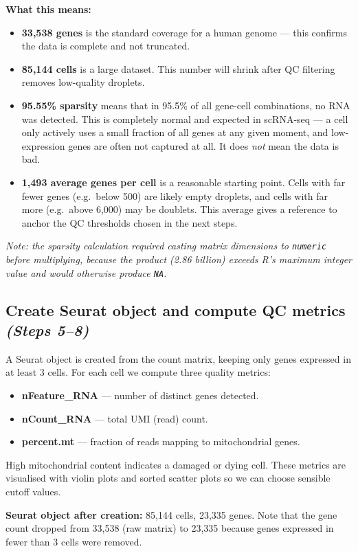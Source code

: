 \documentclass[11pt, a4paper]{article}
\begin{document}
\textbf{What this means:}
\begin{itemize}[nosep]
  \item \textbf{33,538 genes} is the standard coverage for a human genome — this confirms the data is complete and not truncated.
  \item \textbf{85,144 cells} is a large dataset. This number will shrink after QC filtering removes low-quality droplets.
  \item \textbf{95.55\% sparsity} means that in 95.5\% of all gene-cell combinations, no RNA was detected. This is completely normal and expected in scRNA-seq — a cell only actively uses a small fraction of all genes at any given moment, and low-expression genes are often not captured at all. It does \textit{not} mean the data is bad.
  \item \textbf{1,493 average genes per cell} is a reasonable starting point. Cells with far fewer genes (e.g.\ below 500) are likely empty droplets, and cells with far more (e.g.\ above 6,000) may be doublets. This average gives a reference to anchor the QC thresholds chosen in the next steps.
\end{itemize}

\textit{Note: the sparsity calculation required casting matrix dimensions to
\texttt{numeric} before multiplying, because the product (2.86 billion) exceeds
R's maximum integer value and would otherwise produce \texttt{NA}.}

\subsection{Create Seurat object and compute QC metrics \small\normalfont\textit{(Steps 5–8)}}
A Seurat object is created from the count matrix, keeping only genes expressed
in at least 3 cells.
For each cell we compute three quality metrics:
\begin{itemize}[nosep]
  \item \textbf{nFeature\_RNA} — number of distinct genes detected.
  \item \textbf{nCount\_RNA} — total UMI (read) count.
  \item \textbf{percent.mt} — fraction of reads mapping to mitochondrial genes.
\end{itemize}
High mitochondrial content indicates a damaged or dying cell.
These metrics are visualised with violin plots and sorted scatter plots
so we can choose sensible cutoff values.

\textbf{Seurat object after creation:} 85,144 cells, 23,335 genes.
Note that the gene count dropped from 33,538 (raw matrix) to 23,335 because genes
expressed in fewer than 3 cells were removed.
\end{document}
